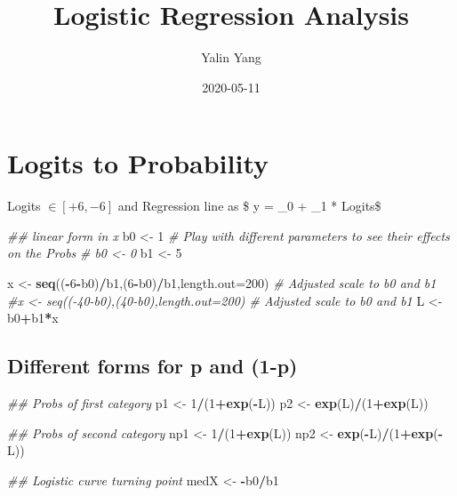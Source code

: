 \documentclass[
]{article}
\title{Logistic Regression Analysis}
\author{Yalin Yang}
\date{2020-05-11}
\newenvironment{Shaded}{\begin{snugshade}}{\end{snugshade}}
\newcommand{\CommentTok}[1]{\textcolor[rgb]{0.56,0.35,0.01}{\textit{#1}}}
\newcommand{\DataTypeTok}[1]{\textcolor[rgb]{0.13,0.29,0.53}{#1}}
\newcommand{\DecValTok}[1]{\textcolor[rgb]{0.00,0.00,0.81}{#1}}
\newcommand{\KeywordTok}[1]{\textcolor[rgb]{0.13,0.29,0.53}{\textbf{#1}}}
\newcommand{\NormalTok}[1]{#1}
\newcommand{\OperatorTok}[1]{\textcolor[rgb]{0.81,0.36,0.00}{\textbf{#1}}}
\newcommand{\StringTok}[1]{\textcolor[rgb]{0.31,0.60,0.02}{#1}}
\begin{document}
\maketitle

{
\setcounter{tocdepth}{3}
\tableofcontents
}
\hypertarget{logits-to-probability}{%
\section{Logits to Probability}\label{logits-to-probability}}

Logits \(\in [+6,-6]\) and Regression line as \$ y = \beta\_0 + \beta\_1
* Logits\$

\begin{Shaded}
\begin{Highlighting}[]
\CommentTok{## linear form in x}
\NormalTok{b0 <-}\StringTok{ }\DecValTok{1}   \CommentTok{# Play with different parameters to see their effects on the Probs}
\CommentTok{# b0 <- 0}
\NormalTok{b1 <-}\StringTok{ }\DecValTok{5}

\NormalTok{x <-}\StringTok{ }\KeywordTok{seq}\NormalTok{((}\OperatorTok{-}\DecValTok{6}\OperatorTok{-}\NormalTok{b0)}\OperatorTok{/}\NormalTok{b1,(}\DecValTok{6}\OperatorTok{-}\NormalTok{b0)}\OperatorTok{/}\NormalTok{b1,}\DataTypeTok{length.out=}\DecValTok{200}\NormalTok{)  }\CommentTok{# Adjusted scale to b0 and b1}
\CommentTok{#x <- seq((-40-b0),(40-b0),length.out=200)  # Adjusted scale to b0 and b1}
\NormalTok{L <-}\StringTok{ }\NormalTok{b0}\OperatorTok{+}\NormalTok{b1}\OperatorTok{*}\NormalTok{x}
\end{Highlighting}
\end{Shaded}

\hypertarget{different-forms-for-p-and-1-p}{%
\subsection{Different forms for p and
(1-p)}\label{different-forms-for-p-and-1-p}}

\begin{Shaded}
\begin{Highlighting}[]
\CommentTok{## Probs of first category}
\NormalTok{p1 <-}\StringTok{ }\DecValTok{1}\OperatorTok{/}\NormalTok{(}\DecValTok{1}\OperatorTok{+}\KeywordTok{exp}\NormalTok{(}\OperatorTok{-}\NormalTok{L))}
\NormalTok{p2 <-}\StringTok{ }\KeywordTok{exp}\NormalTok{(L)}\OperatorTok{/}\NormalTok{(}\DecValTok{1}\OperatorTok{+}\KeywordTok{exp}\NormalTok{(L))}

\CommentTok{## Probs of second category}
\NormalTok{np1 <-}\StringTok{ }\DecValTok{1}\OperatorTok{/}\NormalTok{(}\DecValTok{1}\OperatorTok{+}\KeywordTok{exp}\NormalTok{(L))}
\NormalTok{np2 <-}\StringTok{ }\KeywordTok{exp}\NormalTok{(}\OperatorTok{-}\NormalTok{L)}\OperatorTok{/}\NormalTok{(}\DecValTok{1}\OperatorTok{+}\KeywordTok{exp}\NormalTok{(}\OperatorTok{-}\NormalTok{L))}

\CommentTok{## Logistic curve turning point}
\NormalTok{medX <-}\StringTok{ }\OperatorTok{-}\NormalTok{b0}\OperatorTok{/}\NormalTok{b1}
\end{Highlighting}
\end{Shaded}
\end{document}
